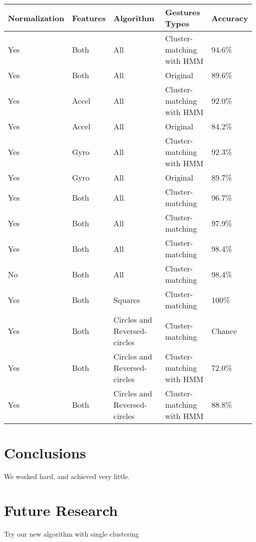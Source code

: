 \documentclass[12pt]{article}
\begin{document}
\begin{center}
\begin{tabular}{ | l | l | l | l | l | }
  \hline
  Normalization & Features & Algorithm & Gestures Types & Accuracy \\ \hline
  Yes	&	Both  &	All & Cluster-matching with HMM &	94.6\% \\ \hline
  Yes	&	Both	&	All & Original  &	89.6\% \\ \hline
  Yes	&	Accel &	All & Cluster-matching with HMM &	92.0\% \\ \hline
  Yes	&	Accel &	All &	Original & 84.2\% \\ \hline
  Yes	&	Gyro  &	All & Cluster-matching with HMM & 92.3\% \\ \hline
  Yes	&	Gyro  &	All & Original &  89.7\% \\ \hline
  Yes	&	Both	&	All &	Cluster-matching &  96.7\% \\ \hline
  Yes	&	Both	&	All &	Cluster-matching &  97.9\% \\ \hline
  Yes	&	Both  &	All &	Cluster-matching & 	98.4\% \\ \hline
  No	&	Both	&	All &	Cluster-matching & 	98.4\% \\ \hline
  Yes	&	Both	& Squares &	Cluster-matching & 	100\% \\ \hline
  Yes	&	Both	& Circles and Reversed-circles  &	Cluster-matching & 	Chance \\ \hline
  Yes	&	Both	& Circles and Reversed-circles  &	Cluster-matching with HMM &	72.0\% \\ \hline
  Yes	&	Both  & Circles and Reversed-circles  &	Cluster-matching with HMM	& 88.8\% \\
  \hline
\end{tabular}
\end{center}

\section{Conclusions}\label{conclusions}
We worked hard, and achieved very little.

\section{Future Research}
Try our new algorithm with single clustering



\end{document}
